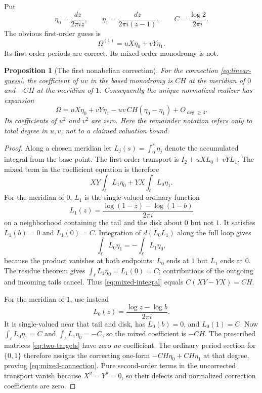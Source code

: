 \documentclass[11pt,letterpaper]{article}
\numberwithin{equation}{section}
\newtheorem{proposition}[theorem]{Proposition}
\theoremstyle{definition}
\theoremstyle{remark}
\begin{document}
Put
\[
 \eta_0=\frac{dz}{2\pi i z},\qquad
 \eta_1=\frac{dz}{2\pi i(z-1)},\qquad
 C=\frac{\log 2}{2\pi i}.
\]
The obvious first-order guess is
\begin{equation}\label{eq:linear-guess}
 \Omega^{(1)}=uX\eta_0+vY\eta_1.
\end{equation}
Its first-order periods are correct. Its mixed-order monodromy is not.

\begin{proposition}[The first nonabelian correction]\label{prop:mixed}
For the connection \eqref{eq:linear-guess}, the coefficient of $uv$ in the
based monodromy is $CH$ at the meridian of $0$ and $-CH$ at the meridian
of $1$. Consequently the unique normalized realizer has expansion
\begin{equation}\label{eq:mixed-connection}
 \boxed{\quad
 \Omega=uX\eta_0+vY\eta_1
          -uv\,C H(\eta_0-\eta_1)+O_{\deg\geq3}.
 \quad}
\end{equation}
Its coefficients of $u^2$ and $v^2$ are zero. Here the remainder notation
refers only to total degree in $u,v$, not to a claimed valuation bound.
\end{proposition}

\begin{proof}
Along a chosen meridian let
$L_j(s)=\int_0^s\eta_j$ denote the accumulated integral from the base point.
The first-order transport is $I_2+uXL_0+vYL_1$. The mixed term in the
coefficient equation is therefore
\begin{equation}\label{eq:mixed-integral}
 XY\int_\ell L_1\eta_0+YX\int_\ell L_0\eta_1.
\end{equation}
For the meridian of $0$, $L_1$ is the single-valued ordinary function
\[
 L_1(z)=\frac{\log(1-z)-\log(1-b)}{2\pi i}
\]
on a neighborhood containing the tail and the disk about $0$ but not $1$.
It satisfies $L_1(b)=0$ and $L_1(0)=C$.
Integration of $d(L_0L_1)$ along the full loop gives
\[
 \int_\ell L_0\eta_1=-\int_\ell L_1\eta_0,
\]
because the product vanishes at both endpoints: $L_0$ ends at $1$ but
$L_1$ ends at $0$. The residue theorem gives
$\int_\ell L_1\eta_0=L_1(0)=C$; contributions of the outgoing and incoming
tails cancel. Thus \eqref{eq:mixed-integral} equals $C(XY-YX)=CH$.

For the meridian of $1$, use instead
\[
 L_0(z)=\frac{\log z-\log b}{2\pi i}.
\]
It is single-valued near that tail and disk, has $L_0(b)=0$, and
$L_0(1)=C$. Now
$\int_\ell L_0\eta_1=C$ and
$\int_\ell L_1\eta_0=-C$, so the mixed coefficient is $-CH$.
The prescribed matrices \eqref{eq:two-targets} have zero $uv$ coefficient.
The ordinary period section for $\{0,1\}$ therefore assigns the correcting
one-form $-CH\eta_0+CH\eta_1$ at that degree, proving
\eqref{eq:mixed-connection}. Pure second-order terms in the uncorrected
transport vanish because $X^2=Y^2=0$, so their defects and normalized
correction coefficients are zero.
\end{proof}
\end{document}
